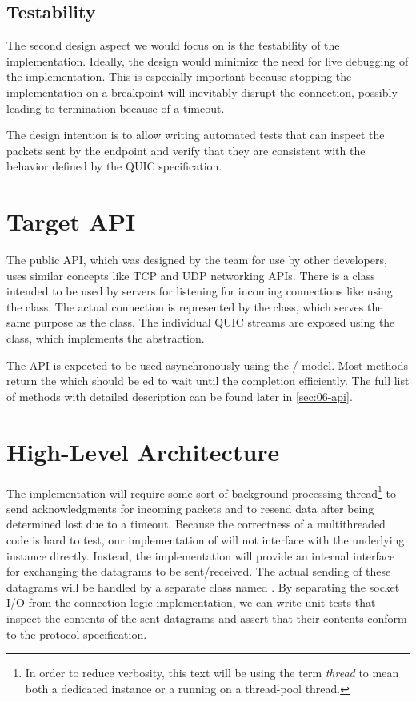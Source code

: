 \subsection{Testability}

The second design aspect we would focus on is the testability of the implementation. Ideally, the
design would minimize the need for live debugging of the implementation. This is especially
important because stopping the implementation on a breakpoint will inevitably disrupt the
connection, possibly leading to termination because of a timeout.

The design intention is to allow writing automated tests that can inspect the packets sent by the
endpoint and verify that they are consistent with the behavior defined by the QUIC specification.

\section{Target \dotnet{} API}

The public API, which was designed by the \dotnet{} team for use by other developers, uses similar
concepts like TCP and UDP \dotnet{} networking APIs. There is a \QuicListener{} class intended to be
used by servers for listening for incoming connections like using the  class. The
actual connection is represented by the \QuicConnection{} class, which serves the same purpose as
the  class. The individual QUIC streams are exposed using the \QuicStream{} class,
which implements the  abstraction.

The API is expected to be used asynchronously using the / model. Most
methods return the  which should be ed to wait until the completion
efficiently. The full list of methods with detailed description can be found later in
\autoref{sec:06-api}.

\section{High-Level Architecture}\label{sec:03-high-level-architecture}

The \QuicConnection{} implementation will require some sort of background processing
thread\footnote{In order to reduce verbosity, this text will be using the term \textit{thread} to
mean both a dedicated  instance or a  running on a thread-pool thread.} to
send acknowledgments for incoming packets and to resend data after being determined lost due to a
timeout. Because the correctness of a multithreaded code is hard to test, our implementation of
\QuicConnection{} will not interface with the underlying \Socket{} instance directly. Instead, the
implementation will provide an internal interface for exchanging the datagrams to be sent/received.
The actual sending of these datagrams will be handled by a separate class named
\QuicSocketContext{}. By separating the socket I/O from the connection logic implementation, we can
write unit tests that inspect the contents of the sent datagrams and assert that their contents
conform to the protocol specification.

